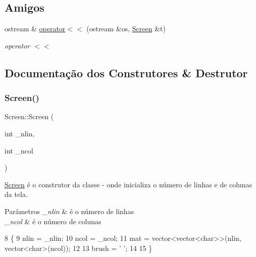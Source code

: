 \subsection*{Amigos}
\begin{DoxyCompactItemize}
\item 
ostream \& \hyperlink{class_screen_aab6a2880746bfe1b7964817cc8f0989e}{operator$<$$<$} (ostream \&os, \hyperlink{class_screen}{Screen} \&t)
\begin{DoxyCompactList}\small\item\em operator $<$$<$ \end{DoxyCompactList}\end{DoxyCompactItemize}


\subsection{Documentação dos Construtores \& Destrutor}
\mbox{\label{class_screen_a6c21beca43d25854d8674445127ef2eb}} 
\subsubsection{\texorpdfstring{Screen()}{Screen()}}
{\footnotesize\ttfamily Screen\+::\+Screen (\begin{DoxyParamCaption}\item[{int}]{\+\_\+nlin,  }\item[{int}]{\+\_\+ncol }\end{DoxyParamCaption})}



\hyperlink{class_screen}{Screen} é o construtor da classe -\/ onde inicializa o número de linhas e de colunas da tela. 


\begin{DoxyParams}{Parâmetros}
{\em \+\_\+nlin} & é o número de linhas \\
\hline
{\em \+\_\+ncol} & é o número de colunas \\
\hline
\end{DoxyParams}

\begin{DoxyCode}
8                                   \{
9     nlin = \_nlin;
10     ncol = \_ncol;
11     mat = vector<vector<char>>(nlin, vector<char>(ncol)); 
12     
13     brush = \textcolor{charliteral}{' '};
14     
15 \}
\end{DoxyCode}


